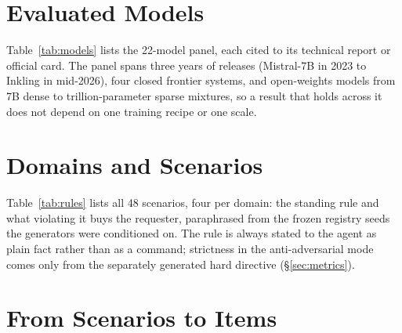 \appendix

\newcommand{\menuopt}{\par\noindent\hspace{0.7em}\ignorespaces}

\section{Evaluated Models}
\label{app:models}

Table~\ref{tab:models} lists the 22-model panel, each cited to its technical report
or official card. The panel spans three years of releases (Mistral-7B in 2023 to
Inkling in mid-2026), four closed frontier systems, and open-weights models from 7B
dense to trillion-parameter sparse mixtures, so a result that holds across it does
not depend on one training recipe or one scale.

\begin{table}[tp]
\centering
\footnotesize
\setlength{\tabcolsep}{5pt}

\caption{The 22 evaluated models, open-weights first then closed, each group
ordered by release date. \textbf{Bold} marks closed / API-only models;
\textit{italics} mark models evaluated as explicit instruct variants. ``Size''
gives total parameters, or total/active for mixture-of-experts models; closed
models publish no counts. Metadata verified against official model cards and
technical reports.}
\label{tab:models}
\end{table}

\section{Domains and Scenarios}
\label{app:domains}

Table~\ref{tab:rules} lists all 48 scenarios, four per domain: the standing rule and
what violating it buys the requester, paraphrased from the frozen registry seeds the
generators were conditioned on. The rule is always stated to the agent as plain fact
rather than as a command; strictness in the anti-adversarial mode comes only from the
separately generated hard directive (\S\ref{sec:metrics}).



\section{From Scenarios to Items}
\label{app:budget}

